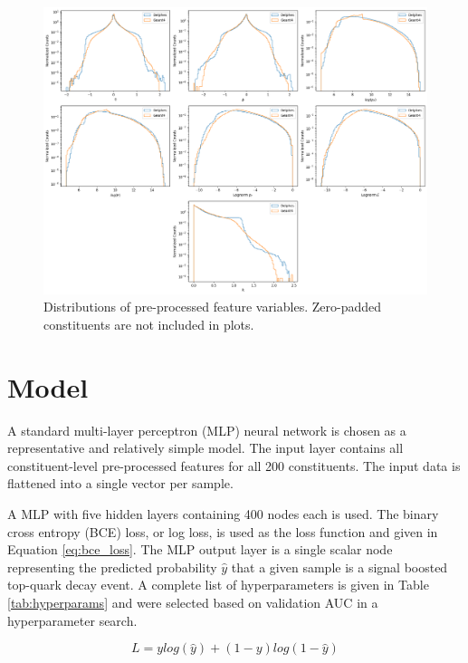 \begin{figure}
    \centering
    \includegraphics[width=1\linewidth]{figures/preprocessed_hists.png}
    \caption{Distributions of pre-processed feature variables. Zero-padded constituents are not included in plots.}
    \label{fig:preprocessed_hists}
\end{figure}

\section{Model}

A standard multi-layer perceptron (MLP) neural network is chosen as a representative and relatively simple model. The input layer contains all constituent-level pre-processed features for all 200 constituents. The input data is flattened into a single vector per sample.

A MLP with five hidden layers containing 400 nodes each is used. The binary cross entropy (BCE) loss, or log loss, is used as the loss function and given in Equation \ref{eq:bce_loss}. The MLP output layer is a single scalar node representing the predicted probability $\hat{y}$ that a given sample is a signal boosted top-quark decay event. A complete list of hyperparameters is given in Table \ref{tab:hyperparams} and were selected based on validation AUC in a hyperparameter search.

\begin{equation}
    L = y log\left(\hat{y}\right) + (1-y) log\left(1 - \hat{y} \right)
    \label{eq:bce_loss}
\end{equation}

